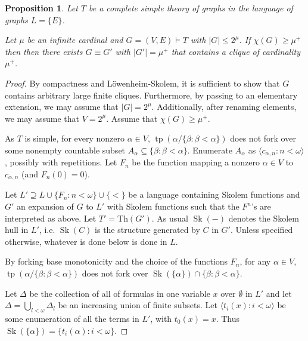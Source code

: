 \documentclass[a4paper]{amsart}
\theoremstyle{plain}
\newtheorem{proposition}[theorem]{Proposition}
\theoremstyle{definition}
\theoremstyle{remark}
\numberwithin{equation}{section}
\DeclareMathOperator{\tp}{tp}
\DeclareMathOperator{\Sk}{Sk}
\begin{document}
\begin{proposition}\label{P:cannot embed infinite complete graph}
Let $T$ be a complete simple theory of graphs in the language of graphs $L=\{E\}$.

Let $\mu$ be an infinite cardinal and $G=(V,E)\vDash T$ with $|G|\leq 2^\mu$. If $\chi(G)\geq \mu^+$ then then there exists $G\equiv G'$ with $|G'|=\mu^+$ that contains a clique of cardinality $\mu^+$. 
\end{proposition}
\begin{proof}
By compactness and L\"owenheim-Skolem, it is sufficient to show that $G$ contains arbitrary large finite cliques. Furthermore, by passing to an elementary extension, we may assume that $|G|=2^\mu$. Additionally, after renaming elements, we may assume that $V=2^\mu$. Assume that $\chi(G)\geq \mu^+$.

As $T$ is simple, for every nonzero $\alpha\in V$,  $\tp(\alpha/\{\beta:\beta<\alpha\})$ does not fork over some nonempty countable subset $A_\alpha\subseteq \{\beta:\beta<\alpha\}$. Enumerate $A_\alpha$ as $\langle c_{\alpha,n}:n<\omega\rangle$, possibly with repetitions. Let $F_n$ be the function mapping a nonzero $\alpha\in V$ to $c_{\alpha,n}$ (and $F_n(0)=0$). 

Let $L' \supseteq L\cup \{F_n:n<\omega\}\cup \{<\}$ be a language containing Skolem functions and $G'$ an expansion of $G$ to $L'$ with Skolem functions such that the $F^n$'s are interpreted as above. Let $T'=\mathrm{Th}(G')$. As usual $\Sk(-)$ denotes the Skolem hull in $L'$, i.e. $\Sk(C)$ is the structure generated by $C$ in $G'$. Unless specified otherwise, whatever is done below is done in $L$.  

By forking base monotonicity and the choice of the functions $F_n$, for any $\alpha\in V$, $\tp(\alpha/\{\beta:\beta<\alpha\})$ does not fork over $\Sk(\{\alpha\})\cap \{\beta:\beta<\alpha\}$.
%

Let $\Delta$ be the collection of all of formulas in one variable $x$ over $\emptyset$ in $L'$ and let $\Delta=\bigcup_{l<\omega}\Delta_l$ be an increasing union of finite subsets. Let $\langle t_i(x): i<\omega\rangle$ be some enumeration of all the terms in $L'$, with $t_0(x)=x$. Thus $\Sk(\{ \alpha\})=\{t_i(\alpha):i<\omega\}$.


\end{proof}
\end{document}
